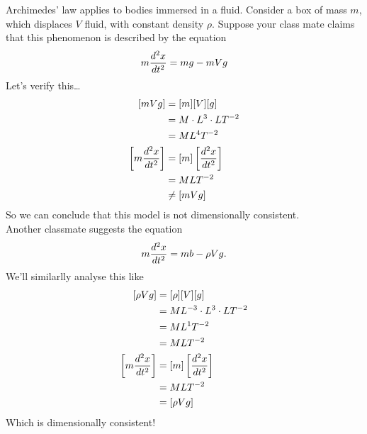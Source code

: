 \documentclass{report}
\begin{document}
Archimedes' law applies to bodies immersed in a fluid. Consider a box of mass $m$, which displaces $V$ fluid, with constant density $\rho$. Suppose your class mate claims that this phenomenon is described by the equation
$$
	m\dyd[^2x]{t^2} = mg - mVg
$$
Let's verify this\dots
\begin{align*}
	\sqbracks{mVg} &= [m][V][g] \\
		&= M\cd L^3 \cd LT^{-2} \\
		&= ML^4T^{-2} \\
	\sqbracks{m\dyd[^2x]{t^2}} &= [m]\sqbracks{\dyd[^2x]{t^2}} \\
		&= MLT^{-2} \\
		&\neq [mVg]
\end{align*}
So we can conclude that this model is not dimensionally consistent.\\
Another classmate suggests the equation
$$
	m\dyd[^2x]{t^2} = mb - \rho Vg.
$$
We'll similarlly analyse this like
\begin{align*}
	\sqbracks{\rho Vg} &= [\rho][V][g] \\
		&= ML^{-3}\cd L^3 \cd LT^{-2} \\
		&= ML^1T^{-2} \\
		&= MLT^{-2} \\
\sqbracks{m\dyd[^2x]{t^2}} &= [m]\sqbracks{\dyd[^2x]{t^2}} \\
		&= MLT^{-2} \\
		&= \sqbracks{\rho Vg}
\end{align*}
Which is dimensionally consistent!\\
\end{document}
